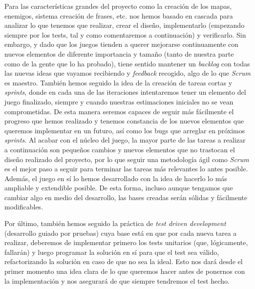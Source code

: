 Para las características grandes del proyecto como la creación de los mapas, enemigos, sistema creación de frases, etc. nos hemos basado en cascada para analizar lo que tenemos que realizar, crear el diseño, implementarlo (empezando siempre por los tests, tal y como comentaremos a continuación) y verificarlo. Sin embargo, y dado que los juegos tienden a querer mejorarse continuamente con nuevos elementos de diferente importancia y tamaño (tanto de nuestra parte como de la gente que lo ha probado), tiene sentido mantener un \textit{backlog} con todas las nuevas ideas que vayamos recibiendo y \textit{feedback} recogido, algo de lo que \textit{Scrum} es maestro. 
También hemos seguido la idea de la creación de tareas cortas y \textit{sprints}, donde en cada una de las iteraciones intentaremos tener un elemento del juego finalizado, siempre y cuando nuestras estimaciones iniciales no se vean comprometidas. De esta manera seremos capaces de seguir más fácilmente el progreso que hemos realizado y tenemos constancia de los nuevos elementos que queremos implementar en un futuro, así como los bugs que arreglar en próximos \textit{sprints}.
Al acabar con el núcleo del juego, la mayor parte de las tareas a realizar a continuación son pequeños cambios y nuevos elementos que no trastocan el diseño realizado del proyecto, por lo que seguir una metodología ágil como \textit{Scrum} es el mejor paso a seguir para terminar las tareas más relevantes lo antes posible. Además, el juego en sí lo hemos desarrollado con la idea de hacerlo lo más ampliable y extendible posible. De esta forma, incluso aunque tengamos que cambiar algo en medio del desarrollo, las bases creadas serán sólidas y fácilmente modificables. 

Por último, también hemos seguido la práctica de \textit{test driven development} (desarrollo guiado por pruebas) cuya base está en que por cada nueva tarea a realizar, deberemos de implementar primero los tests unitarios (que, lógicamente, fallarán) y luego programar la solución en sí para que el test sea válido, refactorizando la solución en caso de que no sea la ideal. Esto nos dará desde el primer momento una idea clara de lo que queremos hacer antes de ponernos con la implementación y nos asegurará de que siempre tendremos el test hecho.